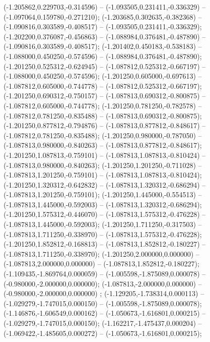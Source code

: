  (-1.205862,0.229703,-0.314596) -- (-1.093505,0.231411,-0.336329) -- (-1.097064,0.159780,-0.271210);
 (-1.203685,0.302635,-0.382368) -- (-1.090816,0.303589,-0.408517) -- (-1.093505,0.231411,-0.336329);
 (-1.202200,0.376087,-0.456863) -- (-1.088984,0.376481,-0.487890) -- (-1.090816,0.303589,-0.408517);
 (-1.201402,0.450183,-0.538183) -- (-1.088000,0.450250,-0.574596) -- (-1.088984,0.376481,-0.487890);
 (-1.201250,0.525312,-0.624945) -- (-1.087812,0.525312,-0.667197) -- (-1.088000,0.450250,-0.574596);
 (-1.201250,0.605000,-0.697613) -- (-1.087812,0.605000,-0.744778) -- (-1.087812,0.525312,-0.667197);
 (-1.201250,0.690312,-0.750157) -- (-1.087813,0.690312,-0.800875) -- (-1.087812,0.605000,-0.744778);
 (-1.201250,0.781250,-0.782578) -- (-1.087812,0.781250,-0.835488) -- (-1.087813,0.690312,-0.800875);
 (-1.201250,0.877812,-0.794876) -- (-1.087813,0.877812,-0.848617) -- (-1.087812,0.781250,-0.835488);
 (-1.201250,0.980000,-0.787050) -- (-1.087813,0.980000,-0.840263) -- (-1.087813,0.877812,-0.848617);
 (-1.201250,1.087813,-0.759101) -- (-1.087813,1.087813,-0.810424) -- (-1.087813,0.980000,-0.840263);
 (-1.201250,1.201250,-0.711028) -- (-1.087813,1.201250,-0.759101) -- (-1.087813,1.087813,-0.810424);
 (-1.201250,1.320312,-0.642832) -- (-1.087813,1.320312,-0.686294) -- (-1.087813,1.201250,-0.759101);
 (-1.201250,1.445000,-0.554513) -- (-1.087813,1.445000,-0.592003) -- (-1.087813,1.320312,-0.686294);
 (-1.201250,1.575312,-0.446070) -- (-1.087813,1.575312,-0.476228) -- (-1.087813,1.445000,-0.592003);
 (-1.201250,1.711250,-0.317503) -- (-1.087813,1.711250,-0.338970) -- (-1.087813,1.575312,-0.476228);
 (-1.201250,1.852812,-0.168813) -- (-1.087813,1.852812,-0.180227) -- (-1.087813,1.711250,-0.338970);
 (-1.201250,2.000000,0.000000) -- (-1.087813,2.000000,0.000000) -- (-1.087813,1.852812,-0.180227);
 (-1.109435,-1.869764,0.000059) -- (-1.005598,-1.875089,0.000078) -- (-0.980000,-2.000000,0.000000);
 (-1.087813,-2.000000,0.000000) -- (-0.980000,-2.000000,0.000000) ;
 (-1.129205,-1.738314,0.000113) -- (-1.029279,-1.747015,0.000150) -- (-1.005598,-1.875089,0.000078);
 (-1.146876,-1.606549,0.000162) -- (-1.050673,-1.616801,0.000215) -- (-1.029279,-1.747015,0.000150);
 (-1.162217,-1.475437,0.000204) -- (-1.069422,-1.485605,0.000272) -- (-1.050673,-1.616801,0.000215);
